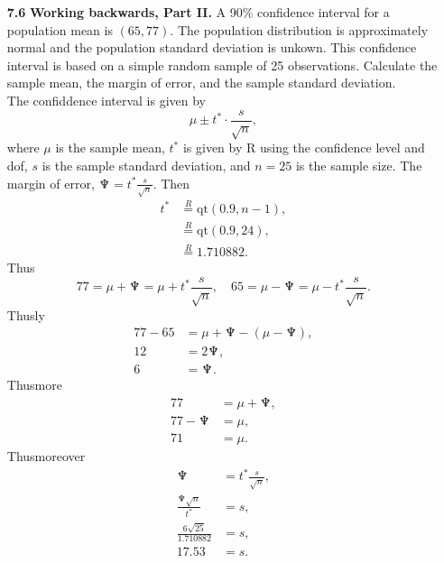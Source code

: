 \documentclass[a4paper, 12pt]{../../config/homework}
\begin{document}
\begin{enumerate}
\pagebreak
\item[\textbf{7.6}] \textbf{Working backwards, Part II.} A 90\% confidence interval for a population mean is \((65, 77)\). The population distribution is approximately normal and the population standard deviation is unkown. This confidence interval is based on a simple random sample of 25 observations. Calculate the sample mean, the margin of error, and the sample standard deviation.
\\The confiddence interval is given by
\[\mu \pm t^*\cdot\frac{s}{\sqrt{n}},\]
where \(\mu \) is the sample mean, \(t^*\) is given by R using the confidence level and dof, \(s\) is the sample standard deviation, and \(n=25\) is the sample size. The margin of error, \(\neptune=t^*\frac{s}{\sqrt{n}}\). Then
\begin{align*}
t^* &\overset{R}{=} \text{qt}(0.9, n-1),\\
&\overset{R}{=} \text{qt}(0.9, 24),\\
&\overset{R}{=} 1.710882.
\end{align*}
Thus
\[77 = \mu + \neptune = \mu + t^*\frac{s}{\sqrt{n}}, \quad 65 = \mu - \neptune = \mu - t^*\frac{s}{\sqrt{n}}.\]
Thusly
\begin{align*}
77 - 65 &= \mu + \neptune - (\mu - \neptune),\\
12 &= 2 \neptune,\\
6 &= \neptune.
\end{align*}
Thusmore
\begin{align*}
77 &= \mu + \neptune,\\
77 - \neptune &= \mu,\\
71 &= \mu.
\end{align*}
Thusmoreover
\begin{align*}
\neptune &= t^* \frac{s}{\sqrt{n}},\\
\frac{\neptune \sqrt{n}}{t^*} &= s,\\
\frac{6\sqrt{25}}{1.710882} &= s,\\
17.53 &= s.
\end{align*}


\end{enumerate}
\end{document}
